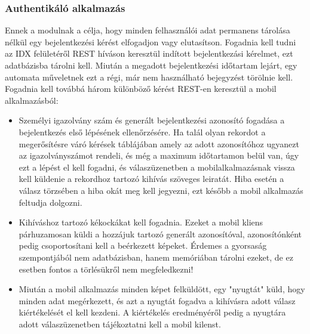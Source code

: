 \subsubsection{Authentikáló alkalmazás}
Ennek a modulnak a célja, hogy minden felhasználói adat permanens tárolása nélkül egy bejelentkezési kérést elfogadjon vagy elutasítson. Fogadnia kell tudni az IDX felületéről REST híváson keresztül indított bejelentkezási kérelmet, ezt adatbázisba tárolni kell. Miután a megadott bejelentkezési időtartam lejárt, egy automata műveletnek ezt a régi, már nem használható bejegyzést törölnie kell.\\
Fogadnia kell továbbá három különböző kérést REST-en keresztül a mobil alkalmazásból:
\begin{itemize}
\item Személyi igazolvány szám és generált bejelentkezési azonosító fogadása a bejelentkezés első lépésének ellenőrzésére. Ha talál olyan rekordot a megerősítésre váró kérések táblájában amely az adott azonosítóhoz ugyanezt az igazolványszámot rendeli, és még a maximum időtartamon belül van, úgy ezt a lépést el kell fogadni, és válaszüzenetben a mobilalkalmazásnak vissza kell küldenie a rekordhoz tartozó kihívás szöveges leiratát. Hiba esetén a válasz törzsében a hiba okát meg kell jegyezni, ezt később a mobil alkalmazás feltudja dolgozni.
\item Kihíváshoz tartozó kékockákat kell fogadnia. Ezeket a mobil kliens párhuzamosan küldi a hozzájuk tartozó generált azonosítóval, azonosítónként pedig csoportosítani kell a beérkezett képeket. Érdemes a gyorsaság szempontjából nem adatbázisban, hanem memóriában tárolni ezeket, de ez esetben fontos a törlésükről nem megfeledkezni!
\item Miután a mobil alkalmazás minden képet felküldött, egy "nyugtát" küld, hogy minden adat megérkezett, és azt a nyugtát fogadva a kihívásra adott válasz kiértékelését el kell kezdeni. A kiértékelés eredményéről pedig a nyugtára adott válaszüzenetben tájékoztatni kell a mobil kilenst.
\end{itemize}


